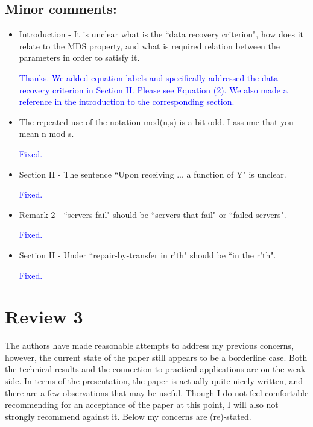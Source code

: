 \documentclass{article}
\begin{document}
\subsection*{Minor comments:}
\begin{itemize}
\item      Introduction - It is unclear what is the ``data recovery criterion", how does it relate to the MDS property, and what is required relation between the parameters in order to satisfy it.

\textcolor{blue}{Thanks. We added equation labels and specifically addressed the data recovery criterion in Section II. Please see Equation (2). We also made a reference in the introduction to the corresponding section. }

\item      The repeated use of the notation mod(n,s) is a bit odd. I assume that you mean n mod s.

\textcolor{blue}{Fixed.}


\item      Section II - The sentence ``Upon receiving ... a function of Y" is unclear.

\textcolor{blue}{Fixed.}

\item      Remark 2 - ``servers fail" should be ``servers that fail" or ``failed servers".

\textcolor{blue}{Fixed.}

\item      Section II - Under ``repair-by-transfer in r'th" should be ``in the r'th".

\textcolor{blue}{Fixed.}

\end{itemize}

\pagebreak


\section*{Review 3}

The authors have made reasonable attempts to address my previous concerns, however, the current state of the paper still appears to be a borderline case. Both the technical results and the connection to practical applications are on the weak side. In terms of the presentation, the paper is actually quite nicely written, and there are a few observations that may be useful. Though I do not feel comfortable recommending for an acceptance of the paper at this point, I will also not strongly recommend against it. Below my concerns are (re)-stated.
\end{document}
